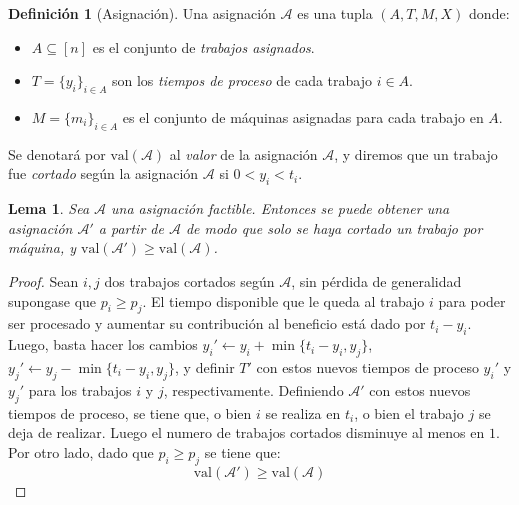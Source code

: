 \documentclass[10pt]{article}
\newcommand{\val}[1]{\text{val}(#1)}
\theoremstyle{plain}
\newtheorem{lem}{Lema}
\theoremstyle{definition}
\newtheorem{defi}{Definición}
\begin{document}
%




\begin{defi}[Asignación]
Una asignación $\mathcal{A}$ es una tupla $(A,T,M,X)$ donde:
\begin{itemize}
\item $A \subseteq [n]$ es el conjunto de \textit{trabajos asignados}.
\item $T = \{y_i\}_{i \in A}$ son los \textit{tiempos de proceso} de cada trabajo $i \in A$.
\item $M = \{m_i\}_{i \in A}$ es el conjunto de máquinas asignadas para cada trabajo en $A$.
\end{itemize}
\end{defi}

Se denotará por $\val{\mathcal{A}}$ al \textit{valor} de la asignación $\mathcal{A}$, y diremos que un trabajo fue \textit{cortado} según la asignación $\mathcal{A}$ si $0<y_i < t_i$. 
\begin{lem}
\label{lem:cortes}
Sea $\mathcal{A}$ una asignación factible. Entonces se puede obtener una asignación $\mathcal{A}'$ a partir de $\mathcal{A}$ de modo que solo se haya cortado un trabajo por máquina, y $\val{\mathcal{A}'} \geq \val{\mathcal{A}}$.
\end{lem}
\begin{proof}
Sean $i,j$ dos trabajos cortados según $\mathcal{A}$, sin pérdida de generalidad supongase que  $p_i \geq p_j$. El tiempo disponible que le queda al trabajo $i$ para poder ser procesado y aumentar su contribución al beneficio está dado por $t_i-y_i$. Luego, basta hacer los cambios $y_i' \gets y_i + \min\{t_i-y_i,y_j\}$, $y_j' \gets y_j -\min\{t_i-y_i,y_j\}$, y definir $T'$ con estos nuevos tiempos de proceso $y_i'$ y $y_j'$ para los trabajos $i$ y $j$, respectivamente. Definiendo $\mathcal{A}'$ con estos nuevos tiempos de proceso, se tiene que, o bien $i$ se realiza en $t_i$, o bien el trabajo $j$ se deja de realizar. Luego el numero de trabajos cortados disminuye al menos en $1$. Por otro lado, dado que $p_i \geq p_j$ se tiene que:
$$
\val{\mathcal{A}'} \geq \val{\mathcal{A}}
$$
\end{proof}
\end{document}
